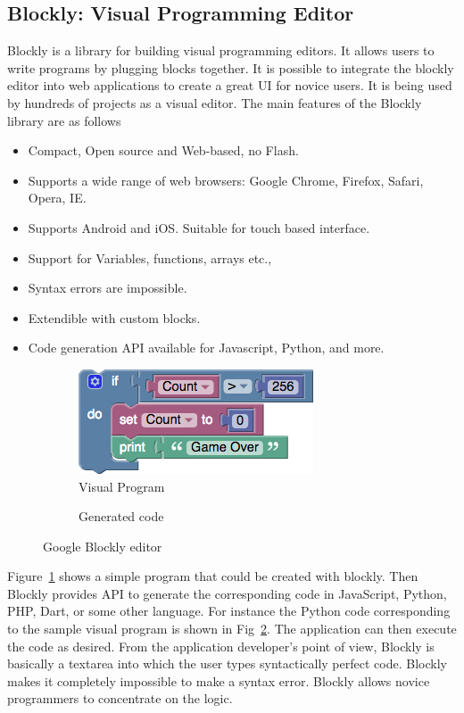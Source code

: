 \subsection{Blockly: Visual Programming Editor}
Blockly \cite{Blockly} is a library for building visual programming editors. It allows users to write programs by plugging blocks together. It is possible to integrate the blockly editor into web applications to create a great UI for novice users. It is being used by hundreds of projects as a visual editor. The main features of the Blockly library are as follows
\begin{itemize}
\item Compact, Open source and Web-based, no Flash.
\item Supports a wide range of web browsers: Google Chrome, Firefox, Safari, Opera, IE.
\item Supports Android and iOS. Suitable for touch based interface.
\item Support for Variables, functions, arrays etc.,
\item Syntax errors are impossible.
\item Extendible with custom blocks.
\item Code generation API available for Javascript, Python, and more.
\end{itemize}
\begin{figure}[H]
\begin{subfigure}[h]{0.4\textwidth}
\includegraphics[width=\textwidth]{assets/blockly_sample.png}
\caption[Visual Program]{Visual Program}
\label{fig:blockly_sample}
\end{subfigure}
\hfill
\begin{subfigure}[h]{0.48\textwidth}

\caption[Generated code]{Generated code}
\label{fig:blockly_sample_code}
\end{subfigure}
\caption[Google Blockly editor]{Google Blockly editor}
\label{fig:pseudo_nodes}
\end{figure}
Figure~\ref{fig:blockly_sample} shows a simple program that could be created with blockly. Then Blockly provides API to generate the corresponding code in JavaScript, Python, PHP, Dart, or some other language. For instance the Python code corresponding to the sample visual program is shown in Fig~\ref{fig:blockly_sample_code}. The application can then execute the code as desired. From the application developer's point of view, Blockly is basically a textarea into which the user types syntactically perfect code. Blockly makes it completely impossible to make a syntax error. Blockly allows novice programmers to concentrate on the logic.

